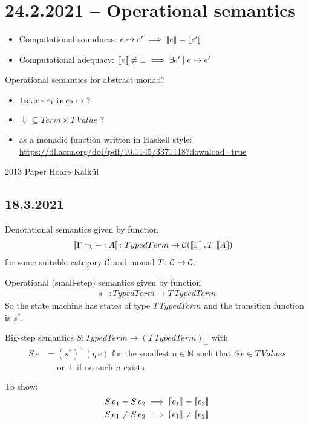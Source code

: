 \documentclass[runningheads,envcountsame]{llncs}
\begin{document}
\section{24.2.2021 -- Operational semantics}

\begin{itemize}
    \item Computational soundness: $e \mapsto e' \implies \sem{e} = \sem{e'}$
    \item Computational adequacy: $\sem{e} \neq \bot \implies \exists e' \mid e \mapsto e'$
\end{itemize}

Operational semantics for abstract monad?
\begin{itemize}
\item $\texttt{let}\,x\,\texttt{=}\,e_1\,\texttt{in}\,e_2 \mapsto {?}$
\item ${\Downarrow} \subseteq {Term} \times T\,{Value}$ ?
\item as a monadic function written in Haskell style: \url{https://dl.acm.org/doi/pdf/10.1145/3371118?download=true}
\end{itemize}

2013 Paper Hoare Kalkül

\subsection{18.3.2021}

Denotational semantics given by function 
\begin{align}
    \sem{\typerulel{\Gamma}{-}{A}} &\colon TypedTerm \to \C(\sem{\Gamma}, T\,\sem{A})
\end{align}
for some suitable category $\mathcal{C}$ and monad $T\colon \mathcal{C} \to \mathcal{C}$.

Operational (small-step) semantics given by function 
\begin{align}
    s &\colon TypedTerm \to T\,TypedTerm
\end{align}
 So the state machine has states of type $T\,TypedTerm$ and the transition function is $s^*$.

Big-step semantics $S\colon TypedTerm \to (T\,TypedTerm)_\bot$ with 
\begin{align}
    S\,e &= (s^*)^n\,(\eta\,e)\text{ for the smallest $n \in \mathbb{N}$ such that $S\,e \in T\,Values$} \\
         &\mathrel{\phantom{=}}\text{or $\bot$ if no such $n$ exists}
\end{align}

To show:
\begin{align}
    S\,e_1 = S\,e_2 \implies \sem{e_1} = \sem{e_2} \label{adequacy1} \\
    S\,e_1 \neq S\,e_2 \implies \sem{e_1} \neq \sem{e_2} \label{adequacy2}
\end{align}
\end{document}
